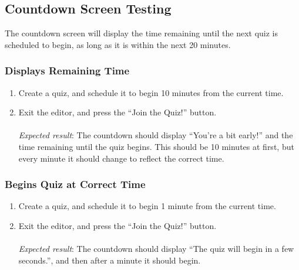 \subsection{Countdown Screen Testing} %
\label{sub:countdown_screen_testing}
The countdown screen will display the time remaining until the next quiz is scheduled to begin, as long as it is within the next 20 minutes.

\subsubsection{Displays Remaining Time} %
\label{ssub:displays_correct_time}
\begin{enumerate}
  \item Create a quiz, and schedule it to begin 10 minutes from the current time.
  \item Exit the editor, and press the ``Join the Quiz!'' button.\\\\
  \textit{Expected result}: The countdown should display ``You're a bit early!'' and the time remaining until the quiz begins. This should be 10 minutes at first, but every minute it should change to reflect the correct time.
\end{enumerate}

\subsubsection{Begins Quiz at Correct Time} %
\label{ssub:begins_quiz_at_correct_time}
\begin{enumerate}
  \item Create a quiz, and schedule it to begin 1 minute from the current time.
  \item Exit the editor, and press the ``Join the Quiz!'' button.\\\\
  \textit{Expected result}: The countdown should display ``The quiz will begin in a few seconds.'', and then after a minute it should begin.
\end{enumerate}
